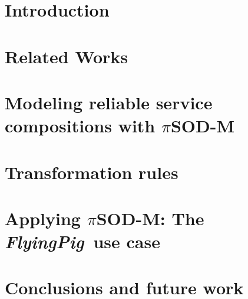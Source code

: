 \documentclass[twocolumn]{svjour3}
\def\FlyingPig{\textsl{FlyingPig}}
\newcommand{\pisodm}[0]{$\pi$SOD-M\xspace}
\begin{document}


\section{Introduction}
\label{sec:intro}


\section{Related Works}
\label{sec:relworks}


\section{Modeling reliable service compositions with \pisodm}\label{sec:motivation}


\section{Transformation rules}\label{sec:mmrules}


\section{Applying \pisodm: The \FlyingPig\ use case}
\label{sec:flyingPig}



\section{Conclusions and future work}\label{sec:conclusions}





\end{document}
